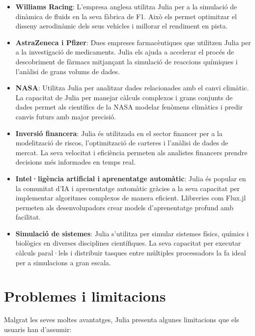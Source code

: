 \documentclass[a4paper]{article}
\begin{document}
\begin{itemize}
    \item \textbf{Williams Racing}: L'empresa anglesa utilitza Julia per a la simulació de dinàmica de fluids en la seva fàbrica de F1. Això els permet optimitzar el disseny aerodinàmic dels seus vehicles i millorar el rendiment en pista.
    \item \textbf{AstraZeneca i Pfizer}: Dues empreses farmacèutiques que utilitzen Julia per a la investigació de medicaments. Julia els ajuda a accelerar el procés de descobriment de fàrmacs mitjançant la simulació de reaccions químiques i l'anàlisi de grans volums de dades.
    \item \textbf{NASA}: Utilitza Julia per analitzar dades relacionades amb el canvi climàtic. La capacitat de Julia per manejar càlculs complexos i grans conjunts de dades permet als científics de la NASA modelar fenòmens climàtics i predir canvis futurs amb major precisió.
    \item \textbf{Inversió financera}: Julia és utilitzada en el sector financer per a la modelització de riscos, l'optimització de carteres i l'anàlisi de dades de mercat. La seva velocitat i eficiència permeten als analistes financers prendre decisions més informades en temps real.
    \item \textbf{Intel·ligència artificial i aprenentatge automàtic}: Julia és popular en la comunitat d'IA i aprenentatge automàtic gràcies a la seva capacitat per implementar algoritmes complexos de manera eficient. Llibreries com Flux.jl permeten als desenvolupadors crear models d'aprenentatge profund amb facilitat.
    \item \textbf{Simulació de sistemes}: Julia s'utilitza per simular sistemes físics, químics i biològics en diverses disciplines científiques. La seva capacitat per executar càlculs paral·lels i distribuir tasques entre múltiples processadors la fa ideal per a simulacions a gran escala.
\end{itemize}

\section{Problemes i limitacions}

Malgrat les seves moltes avantatges, Julia presenta algunes limitacions que els usuaris han d'assumir:
\end{document}
